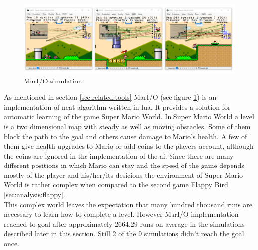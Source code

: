 		\begin{figure}[h]
			\centering
			\includegraphics[width=1\textwidth]{graphics/mario/mario3}
			\caption{MarI/O simulation}
			\label{fig:mario}
		\end{figure}
		As mentioned in section \ref{sec:related:tools} MarI/O (see figure \ref{fig:mario}) is an implementation of \gls{neat}-algorithm written in \gls{lua}. It provides a solution for automatic learning of the game Super Mario World. In Super Mario World a level is a two dimensional map with steady as well as moving obstacles.
		Some of them block the path to the goal and others cause damage to Mario's health. A few of them give health upgrades to Mario or add coins to the players account, although the coins are ignored in the implementation of the \gls{ai}. Since there are many different positions in which Mario can stay and the speed of the game depends mostly of the player and his/her/its desicions the environment of Super Mario World is rather complex when compared to the second game Flappy Bird \ref{sec:analysis:flappy}.\\
		This complex world leaves the expectation that many hundred thousand runs are necessary to learn how to complete a level. However MarI/O implementation reached to goal after approximately $2664.29$ runs on average in the simulations described later in this section. Still 2 of the 9 simulations didn't reach the goal once.\\
		 \\
